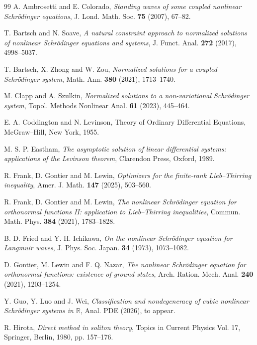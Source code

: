 \documentclass[11pt]{article}
\numberwithin{equation}{section}
\theoremstyle{definition}
\begin{document}
\begin{thebibliography}{99}
A. Ambrosetti and E. Colorado,
\emph{Standing waves of some coupled nonlinear Schr\"{o}dinger equations},
J. Lond. Math. Soc. \textbf{75} (2007), 67--82.

T. Bartsch and N. Soave,
\emph{A natural constraint approach to normalized solutions of nonlinear Schr\"{o}dinger equations and systems},
J. Funct. Anal. \textbf{272} (2017), 4998--5037.

T. Bartsch, X. Zhong and W. Zou,
\emph{Normalized solutions for a coupled Schr\"{o}dinger system},
Math. Ann. \textbf{380} (2021), 1713--1740.

M. Clapp and A. Szulkin,
\emph{Normalized solutions to a non-variational Schr\"{o}dinger system},
Topol. Methods Nonlinear Anal. \textbf{61} (2023), 445--464.

E. A. Coddington and N. Levinson,
{Theory of Ordinary Differential Equations},
McGraw--Hill, New York, 1955.

M. S. P. Eastham,
\emph{The asymptotic solution of linear differential systems:
	applications of the Levinson theorem},
Clarendon Press, Oxford, 1989.

R. Frank, D. Gontier and M. Lewin,
\emph{Optimizers for the finite-rank Lieb--Thirring inequality},
Amer. J. Math. \textbf{147} (2025), 503--560.

R. Frank, D. Gontier and M. Lewin,
\emph{The nonlinear Schr\"{o}dinger equation for orthonormal functions II:
	application to Lieb--Thirring inequalities},
Commun. Math. Phys. \textbf{384} (2021), 1783--1828.

B. D. Fried and Y. H. Ichikawa,
\emph{On the nonlinear Schr\"{o}dinger equation for Langmuir waves},
J. Phys. Soc. Japan. \textbf{34} (1973), 1073--1082.

D. Gontier, M. Lewin and F. Q. Nazar,
\emph{The nonlinear Schr\"{o}dinger equation for orthonormal functions: existence of ground states},
Arch. Ration. Mech. Anal. \textbf{240} (2021), 1203--1254.


Y. Guo, Y. Luo and J. Wei,
\emph{Classification and nondegeneracy of cubic nonlinear Schr\"{o}dinger systems in $\mathbb R$},
Anal. PDE (2026),  to appear.

R. Hirota,
\emph{Direct method in soliton theory},
 Topics in Current Physics Vol. 17,
Springer, Berlin, 1980, pp. 157--176.


\end{thebibliography}
\end{document}
